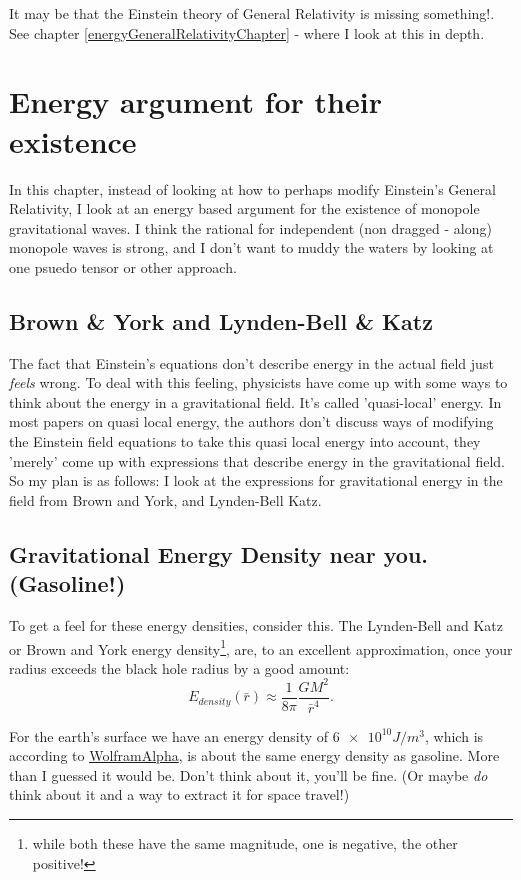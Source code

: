 \documentclass[../rzero]{subfiles}
\begin{document}
It may be that the Einstein theory of General Relativity is missing something!\cite{08092323EnergyMomentumGravitational}. See chapter \ref{energyGeneralRelativityChapter} - where I look at this in depth. 

\section{Energy argument for their existence}
In this chapter, instead of looking at how to perhaps modify Einstein's General Relativity, I look at an energy based argument for the existence of monopole gravitational waves. I think the rational for independent (non dragged - along) monopole waves is strong, and I don't want to muddy the waters by looking at one psuedo tensor or other approach.  

\subsection{Brown \& York and Lynden-Bell \& Katz}
The fact that Einstein's equations don't describe energy in the actual field just \textit{feels} wrong. To deal with this feeling, physicists have come up with some ways to think about the energy in a gravitational field. It's called 'quasi-local' energy. In most papers on quasi local energy, the authors don't discuss ways of modifying the Einstein field equations to take this quasi local energy into account, they 'merely' come up with expressions that describe energy in the gravitational field. So my plan is as follows: I look at the expressions for gravitational energy in the field from Brown and York\cite{Brown1993}, and Lynden-Bell Katz\cite{lyndenbell1985}.

\subsection{Gravitational Energy Density near you. (Gasoline!)}
To get a feel for these energy densities, consider this. The Lynden-Bell and Katz or Brown and York energy density\footnote{while both these have the same magnitude, one is negative, the other positive!}, are, to an excellent approximation, once your radius exceeds the black hole radius by a good amount: 
\begin{equation}
 E_{density}(\bar r) \approx \frac{1}{8 \pi}\frac{GM^2}{\bar r^4}.
\end{equation}

For the earth's surface we have an energy density of $\num{6e10} J/m^3$, which is according to \href{https://www.wolframalpha.com/input?i=G*%28mass+of+earth%29%5E2%2F%28%288*pi%29%286300km%29%5E4%29+in+J%2Fm%5E3}{WolframAlpha}, is about the same energy density as gasoline. More than I guessed it would be. Don't think about it, you'll be fine. (Or maybe \textit{do} think about it and a way to extract it for space travel!)
\end{document}
